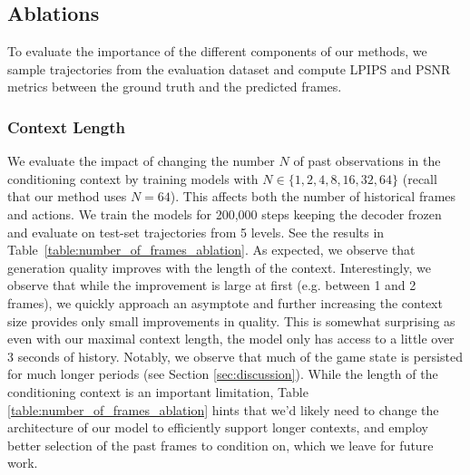 \documentclass{article} %
\begin{document}
\subsection{Ablations}

To evaluate the importance of the different components of our methods, we sample trajectories from the evaluation dataset and compute LPIPS and PSNR metrics between the ground truth and the predicted frames.

\subsubsection{Context Length}
\label{sec:context length}

We evaluate the impact of changing the number $N$ of past observations in the conditioning context by training models with $N \in \{1, 2, 4, 8, 16, 32, 64\}$ (recall that our method uses $N=64$).
This affects both the number of historical frames and actions. We train the models for 200,000 steps keeping the decoder frozen and evaluate on test-set trajectories from 5 levels.
See the results in Table~\ref{table:number_of_frames_ablation}.
As expected, we observe that generation quality improves with the length of the context.
Interestingly, we observe that while the improvement is large at first (e.g. between 1 and 2 frames), we quickly approach an asymptote and further increasing the context size provides only small improvements in quality.
This is somewhat surprising as even with our maximal context length, the model only has access to a little over 3 seconds of history.
Notably, we observe that much of the game state is persisted for much longer periods (see Section \ref{sec:discussion}).
While the length of the conditioning context is an important limitation, Table \ref{table:number_of_frames_ablation} hints that we'd likely need to change the architecture of our model to efficiently support longer contexts, and employ better selection of the past frames to condition on, which we leave for future work.
\end{document}
